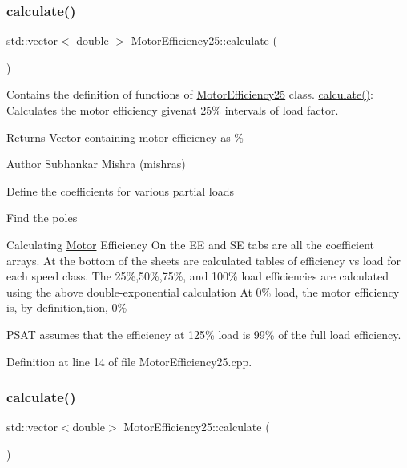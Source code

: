 \subsubsection{\texorpdfstring{calculate()}{calculate()}\hspace{0.1cm}{\footnotesize\ttfamily [1/3]}}
{\footnotesize\ttfamily std\+::vector$<$ double $>$ Motor\+Efficiency25\+::calculate (\begin{DoxyParamCaption}{ }\end{DoxyParamCaption})}



Contains the definition of functions of \hyperlink{class_motor_efficiency25}{Motor\+Efficiency25} class. \hyperlink{class_motor_efficiency25_a2421a96d011677172f43d9929b250188}{calculate()}\+: Calculates the motor efficiency givenat 25\% intervals of load factor. 

\begin{DoxyReturn}{Returns}
Vector containing motor efficiency as \%
\end{DoxyReturn}
\begin{DoxyAuthor}{Author}
Subhankar Mishra (mishras) 
\end{DoxyAuthor}
Define the coefficients for various partial loads

Find the poles

Calculating \hyperlink{class_motor}{Motor} Efficiency On the EE and SE tabs are all the coefficient arrays. At the bottom of the sheets are calculated tables of efficiency vs load for each speed class. The 25\%,50\%,75\%, and 100\% load efficiencies are calculated using the above double-\/exponential calculation At 0\% load, the motor efficiency is, by definition,tion, 0\%

P\+S\+AT assumes that the efficiency at 125\% load is 99\% of the full load efficiency.

Definition at line 14 of file Motor\+Efficiency25.\+cpp.

\mbox{\label{class_motor_efficiency25_a2d7f63fa902f9930f667b779950ffb44}} 
\subsubsection{\texorpdfstring{calculate()}{calculate()}\hspace{0.1cm}{\footnotesize\ttfamily [2/3]}}
{\footnotesize\ttfamily std\+::vector$<$double$>$ Motor\+Efficiency25\+::calculate (\begin{DoxyParamCaption}{ }\end{DoxyParamCaption})}


